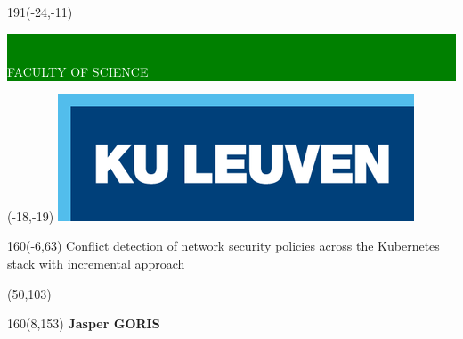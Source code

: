 \thispagestyle{empty}
\newcommand{\form}[1]{\scalebox{1.087}{\boldmath{#1}}}
\sffamily
%
\begin{textblock}{191}(-24,-11)
\colorbox{green}{\hspace{123mm}\ \parbox[c][18truemm]{68mm}{\textcolor{white}{FACULTY OF SCIENCE}}}
\end{textblock}
%
\begin{textblock}{70}(-18,-19)
\textblockcolour{}
\includegraphics*[height=19.8truemm]{frontpage/LogoKULeuven.png}
\end{textblock}
%
\begin{textblock}{160}(-6,63)
\textblockcolour{}
\vspace{-\parskip}
\flushleft
\fontsize{36}{38}\selectfont \textcolor{bluetitle}{Conflict detection of network security policies across the Kubernetes stack with incremental approach}\\[1.5mm]
\end{textblock}
%
\begin{textblock}{79}(50,103)
\textblockcolour{}
\vspace{-\parskip}
\flushleft
\end{textblock}
%
\begin{textblock}{160}(8,153)
\textblockcolour{}
\vspace{-\parskip}
\flushright
\fontsize{14}{16}\selectfont \textbf{Jasper GORIS}
\end{textblock}
